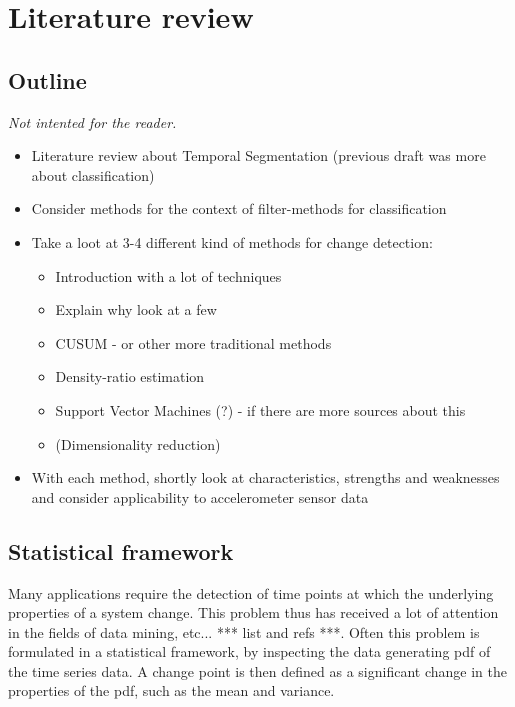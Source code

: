 
\chapter{Literature review}

\label{Chapter2} %


\section{Outline}
\emph{Not intented for the reader.}
\begin{itemize}
  \item Literature review about Temporal Segmentation (previous draft was more about classification)
  \item Consider methods for the context of filter-methods for classification
  \item Take a loot at 3-4 different kind of methods for change detection:
    \begin{itemize}
      \item Introduction with a lot of techniques
      \item Explain why look at a few
      \item CUSUM - or other more traditional methods
      \item Density-ratio estimation
      \item Support Vector Machines (?) - if there are more sources about this
      \item (Dimensionality reduction)
    \end{itemize}
  \item With each method, shortly look at characteristics, strengths and weaknesses and consider applicability to accelerometer sensor data
\end{itemize}


\section{Statistical framework}\label{statistical-framework}
Many applications require the detection of time points at which the underlying properties of a system change.
This problem thus has received a lot of attention in the fields of data mining, etc... *** list and refs ***.
Often this problem is formulated in a statistical framework, by inspecting the data generating \gls{pdf} of the time series data.
A change point is then defined as a significant change in the properties of the \gls{pdf}, such as the mean and variance.

